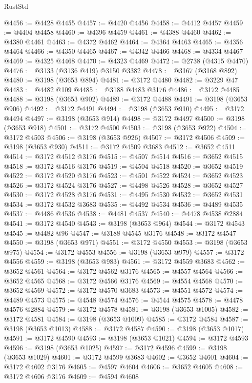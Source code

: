 \begin{lexlean}{RustStd}
\begin{coremodule}
@4456 := @4428 @4455
@4457 := @4420 @4456
@4458 := @4412 @4457
@4459 := @4404 @4458
@4460 := @4396 @4459
@4461 := @4388 @4460
@4462 := @4380 @4461
@4463 := @4372 @4462
@4464 := @4364 @4463
@4465 := @4356 @4464
@4466 := @4350 @4465
@4467 := @4342 @4466
@4468 := @4334 @4467
@4469 := @4325 @4468
@4470 := @4323 @4469
@4472 := @2738 (@4315 @4470)
@4476 := @3133 (@3136 @419) @3150 @3382
@4478 := @3167 (@3168 @892)
@4480 := @3198 (@3653 @894)
@4481 := @3172 @4480
@4482 := @3229 @47
@4483 := @4482 @109
@4485 := @3188 @4483 @3176
@4486 := @3172 @4485
@4488 := @3198 (@3653 @902)
@4489 := @3172 @4488
@4491 := @3198 (@3653 @906)
@4492 := @3172 @4491
@4494 := @3198 (@3653 @910)
@4495 := @3172 @4494
@4497 := @3198 (@3653 @914)
@4498 := @3172 @4497
@4500 := @3198 (@3653 @918)
@4501 := @3172 @4500
@4503 := @3198 (@3653 @922)
@4504 := @3172 @4503
@4506 := @3198 (@3653 @926)
@4507 := @3172 @4506
@4509 := @3198 (@3653 @930)
@4511 := @3172 @4509 @3683
@4512 := @3652 @4511
@4514 := @3172 @4512 @3176
@4515 := @4507 @4514
@4516 := @3652 @4515
@4518 := @3172 @4516 @3176
@4519 := @4504 @4518
@4520 := @3652 @4519
@4522 := @3172 @4520 @3176
@4523 := @4501 @4522
@4524 := @3652 @4523
@4526 := @3172 @4524 @3176
@4527 := @4498 @4526
@4528 := @3652 @4527
@4530 := @3172 @4528 @3176
@4531 := @4495 @4530
@4532 := @3652 @4531
@4534 := @3172 @4532 @3683
@4535 := @4492 @4534
@4536 := @4489 @4535
@4537 := @4486 @4536
@4538 := @4481 @4537
@4540 := @4478 @4538 @2884
@4541 := @3172 @4540
@4543 := @3198 (@3653 @964)
@4544 := @3172 @4543
@4545 := @4482 @96
@4547 := @3188 @4545 @3176
@4548 := @3172 @4547
@4550 := @3198 (@3653 @971)
@4551 := @3172 @4550
@4553 := @3198 (@3653 @975)
@4554 := @3172 @4553
@4556 := @3198 (@3653 @979)
@4557 := @3172 @4556
@4559 := @3198 (@3653 @983)
@4561 := @3172 @4559 @3683
@4562 := @3652 @4561
@4564 := @3172 @4562 @3176
@4565 := @4557 @4564
@4566 := @3652 @4565
@4568 := @3172 @4566 @3176
@4569 := @4554 @4568
@4570 := @3652 @4569
@4572 := @3172 @4570 @3683
@4573 := @4551 @4572
@4574 := @4489 @4573
@4575 := @4548 @4574
@4576 := @4544 @4575
@4578 := @4478 @4576 @2884
@4579 := @3172 @4578
@4581 := @3198 (@3653 @1005)
@4582 := @3172 @4581
@4584 := @3198 (@3653 @1009)
@4585 := @3172 @4584
@4587 := @3198 (@3653 @1013)
@4588 := @3172 @4587
@4590 := @3198 (@3653 @1017)
@4591 := @3172 @4590
@4593 := @3198 (@3653 @1021)
@4594 := @3172 @4593
@4596 := @3198 (@3653 @1025)
@4597 := @3172 @4596
@4599 := @3198 (@3653 @1029)
@4601 := @3172 @4599 @3683
@4602 := @3652 @4601
@4604 := @3172 @4602 @3176
@4605 := @4597 @4604
@4606 := @3652 @4605
@4608 := @3172 @4606 @3176
@4609 := @4594 @4608

\end{coremodule}
\end{lexlean}
